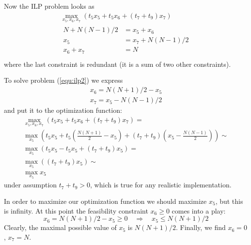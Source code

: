 \documentclass[12pt,a4paper,titlepage,oneside]{article}
\begin{document}
\begin{itemize}
Now the ILP problem looks as 
\begin{equation}
\begin{aligned}
	\max_{x_5, x_6, x_7} \left(t_5 x_5 + t_5 x_6 + (t_7+t_9)x_7 \right)\\
	\left.\begin{aligned}
		N + N(N-1)/2	&= x_5 + x_6\\
		x_5			&= x_7 + N(N-1)/2\\
		x_6 + x_7	&= N\\
	\end{aligned}\right.
\end{aligned}
\label{equ:ilp2}
\end{equation}
where the last constraint is redundant (it is a sum of two other constraints).

To solve problem (\ref{equ:ilp2}) we express
\begin{equation*}
	\left.\begin{aligned}
		x_6 = N(N+1)/2 - x_5\\
		x_7 = x_5 - N(N-1)/2
	\end{aligned}\right.
\end{equation*}
and put it to the optimization function:
\begin{equation*}
	\left.\begin{aligned}
		\max_{x_5, x_6, x_7} \left(t_5x_5 + t_5x_6 + (t_7+t_9)x_7\right) =\\
		\max_{x_5} \left(t_5x_5 + t_5\left(\frac{N(N+1)}2 - x_5\right) + (t_7+t_9)\left(x_5 - \frac{N(N-1)}2\right)\right) \sim\\
		\max_{x_5} \left(t_5x_5 - t_5x_5 + (t_7+t_9)x_5\right) =\\
		\max_{x_5} \left((t_7+t_9)x_5\right) \sim\\
		\max_{x_5} x_5
	\end{aligned}\right.
\end{equation*}
under assumption $t_7+t_9 > 0$, which is true for any realistic implementation.

In order to maximize our optimization function we should maximize $x_5$, but this is infinity.
At this point the feasibility constraint $x_6 \geq 0$ comes into a play:
\begin{equation*}
x_6 = N(N+1)/2 - x_5 \geq 0
\quad\Rightarrow\quad
x_5 \leq N(N+1)/2
\end{equation*}
Clearly, the maximal possible value of $x_5$ is $N(N+1)/2$.
Finally, we find $x_6 = 0$, $x_7 = N$.


\end{itemize}
\end{document}
